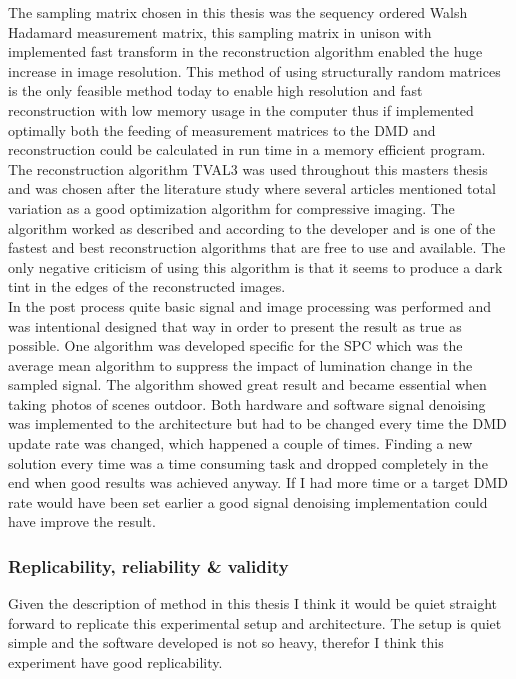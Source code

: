 The sampling matrix chosen in this thesis was the sequency ordered Walsh Hadamard measurement matrix, this sampling matrix in unison with implemented fast transform in the reconstruction algorithm enabled the huge increase in image resolution. This method of using structurally random matrices is the only feasible method today to enable high resolution and fast reconstruction with low memory usage in the computer thus if implemented optimally both the feeding of measurement matrices to the DMD and reconstruction could be calculated in run time in a memory efficient program.\\[0.1in]

The reconstruction algorithm TVAL3 was used throughout this masters thesis and was chosen after the literature study where several articles mentioned total variation as a good optimization algorithm for compressive imaging. The algorithm worked as described and according to the developer and is one of the fastest and best reconstruction algorithms that are free to use and available. The only negative criticism of using this algorithm is that it seems to produce a dark tint in the edges of the reconstructed images.\\[0.1in]

In the post process quite basic signal and image processing was performed and was intentional designed that way in order to present the result as true as possible. One algorithm was developed specific for the SPC which was the average mean algorithm to suppress the impact of lumination change in the sampled signal. The algorithm showed great result and became essential when taking photos of scenes outdoor. Both hardware and software signal denoising was implemented to the architecture but had to be changed every time the DMD update rate was changed, which happened a couple of times. Finding a new solution every time was a time consuming task and dropped completely in the end when good results was achieved anyway. If I had more time or a target DMD rate would have been set earlier a good signal denoising implementation could have improve the result.\\[0.1in]

\subsubsection{Replicability, reliability \& validity}
Given the description of method in this thesis I think it would be quiet straight forward to replicate this experimental setup and architecture. The setup is quiet simple and the software developed is not so heavy, therefor I think this experiment have good replicability.\\[0.1in]

